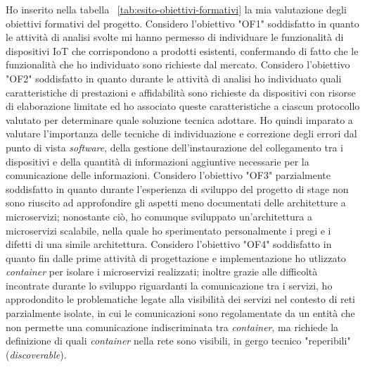Ho inserito nella tabella ~\ref{tab:esito-obiettivi-formativi} la mia valutazione degli obiettivi formativi del progetto.
Considero l'obiettivo "OF1" soddisfatto in quanto le attività di analisi svolte mi hanno permesso di individuare le funzionalità di dispositivi IoT che corrispondono a prodotti esistenti, confermando di fatto che le funzionalità che ho individuato sono richieste dal mercato.
Considero l'obiettivo "OF2" soddisfatto in quanto durante le attività di analisi ho individuato quali caratteristiche di prestazioni e affidabilità sono richieste da dispositivi con risorse di elaborazione limitate ed ho associato queste caratteristiche a ciascun protocollo valutato per determinare quale soluzione tecnica adottare. Ho quindi imparato a valutare l'importanza delle tecniche di individuazione e correzione degli errori dal punto di vista \emph{software}, della gestione dell'instaurazione del collegamento tra i dispositivi e della quantità di informazioni aggiuntive necessarie per la comunicazione delle informazioni.
Considero l'obiettivo "OF3" parzialmente soddisfatto in quanto durante l'esperienza di sviluppo del progetto di stage non sono riuscito ad approfondire gli aspetti meno documentati delle architetture a microservizi; nonostante ciò, ho comunque sviluppato un'architettura a microservizi scalabile, nella quale ho sperimentato personalmente i pregi e i difetti di una simile architettura.
Considero l'obiettivo "OF4" soddisfatto in quanto fin dalle prime attività di progettazione e implementazione ho utlizzato \emph{container} per isolare i microservizi realizzati; inoltre grazie alle difficoltà incontrate durante lo sviluppo riguardanti la comunicazione tra i servizi, ho approdondito le problematiche legate alla visibilità dei servizi nel contesto di reti parzialmente isolate, in cui le comunicazioni sono regolamentate da un entità che non permette una comunicazione indiscriminata tra \emph{container}, ma richiede la definizione di quali \emph{container} nella rete sono visibili, in gergo tecnico "reperibili" (\emph{discoverable}).

